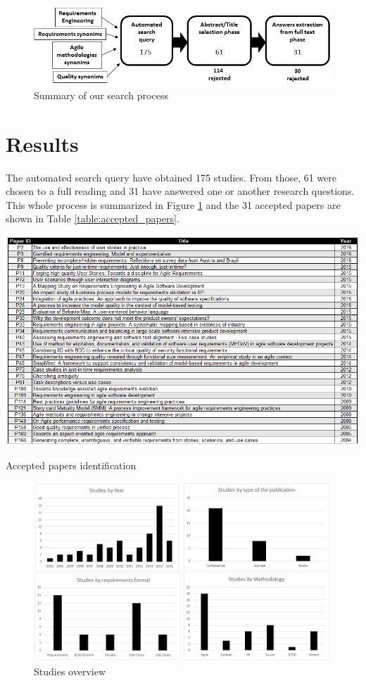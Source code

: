 \begin{figure}[!t]
\centering
\includegraphics[scale=0.75]{images/1_study_methodology}
\caption{Summary of our search process}
\label{fig:study_methodology}
\end{figure}

\section{Results}

The automated search query have obtained 175 studies. From those, 61 were chosen to a full reading and 31 have answered one or another research questions. This whole process is summarized in Figure \ref{fig:study_methodology} and the 31 accepted papers are shown in Table \ref{table:accepted_papers}.

\begin{table}[!t]
\centering
\includegraphics[scale=0.63]{images/PaperID_reference}
\caption{Accepted papers identification}
\label{table:accepted_papers}
\end{table}

\begin{figure}[!b]
\centering
\includegraphics[scale=0.6]{images/2_charts}
\caption{Studies overview}
\label{fig:charts}
\end{figure}

